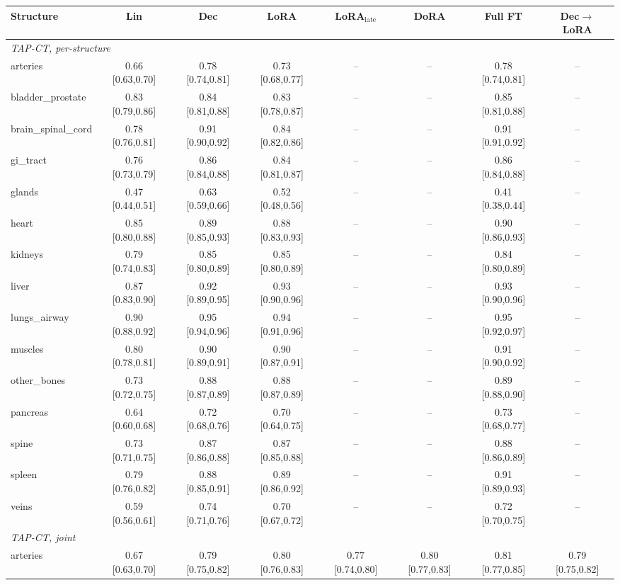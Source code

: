 \begin{tabular}{lccccccc}
\toprule
Structure & Lin & Dec & LoRA & LoRA$_{\text{late}}$ & DoRA & Full FT & Dec$\to$LoRA \\
\midrule
\multicolumn{8}{l}{\textit{TAP-CT, per-structure}} \\
arteries & 0.66 [0.63,0.70] & 0.78 [0.74,0.81] & 0.73 [0.68,0.77] & -- & -- & 0.78 [0.74,0.81] & -- \\
bladder\_prostate & 0.83 [0.79,0.86] & 0.84 [0.81,0.88] & 0.83 [0.78,0.87] & -- & -- & 0.85 [0.81,0.88] & -- \\
brain\_spinal\_cord & 0.78 [0.76,0.81] & 0.91 [0.90,0.92] & 0.84 [0.82,0.86] & -- & -- & 0.91 [0.91,0.92] & -- \\
gi\_tract & 0.76 [0.73,0.79] & 0.86 [0.84,0.88] & 0.84 [0.81,0.87] & -- & -- & 0.86 [0.84,0.88] & -- \\
glands & 0.47 [0.44,0.51] & 0.63 [0.59,0.66] & 0.52 [0.48,0.56] & -- & -- & 0.41 [0.38,0.44] & -- \\
heart & 0.85 [0.80,0.88] & 0.89 [0.85,0.93] & 0.88 [0.83,0.93] & -- & -- & 0.90 [0.86,0.93] & -- \\
kidneys & 0.79 [0.74,0.83] & 0.85 [0.80,0.89] & 0.85 [0.80,0.89] & -- & -- & 0.84 [0.80,0.89] & -- \\
liver & 0.87 [0.83,0.90] & 0.92 [0.89,0.95] & 0.93 [0.90,0.96] & -- & -- & 0.93 [0.90,0.96] & -- \\
lungs\_airway & 0.90 [0.88,0.92] & 0.95 [0.94,0.96] & 0.94 [0.91,0.96] & -- & -- & 0.95 [0.92,0.97] & -- \\
muscles & 0.80 [0.78,0.81] & 0.90 [0.89,0.91] & 0.90 [0.87,0.91] & -- & -- & 0.91 [0.90,0.92] & -- \\
other\_bones & 0.73 [0.72,0.75] & 0.88 [0.87,0.89] & 0.88 [0.87,0.89] & -- & -- & 0.89 [0.88,0.90] & -- \\
pancreas & 0.64 [0.60,0.68] & 0.72 [0.68,0.76] & 0.70 [0.64,0.75] & -- & -- & 0.73 [0.68,0.77] & -- \\
spine & 0.73 [0.71,0.75] & 0.87 [0.86,0.88] & 0.87 [0.85,0.88] & -- & -- & 0.88 [0.86,0.89] & -- \\
spleen & 0.79 [0.76,0.82] & 0.88 [0.85,0.91] & 0.89 [0.86,0.92] & -- & -- & 0.91 [0.89,0.93] & -- \\
veins & 0.59 [0.56,0.61] & 0.74 [0.71,0.76] & 0.70 [0.67,0.72] & -- & -- & 0.72 [0.70,0.75] & -- \\
\multicolumn{8}{l}{\textit{TAP-CT, joint}} \\
arteries & 0.67 [0.63,0.70] & 0.79 [0.75,0.82] & 0.80 [0.76,0.83] & 0.77 [0.74,0.80] & 0.80 [0.77,0.83] & 0.81 [0.77,0.85] & 0.79 [0.75,0.82] \\

\end{tabular}
